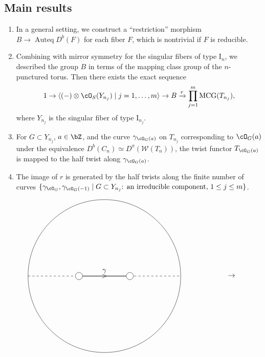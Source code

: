 \documentclass[a0,landscape]{a0poster}
\theoremstyle{plain}
\theoremstyle{definition}
\DeclareMathOperator{\Auteq}{\mathrm{Auteq}}
\DeclareMathOperator{\MCG}{\mathrm{MCG}}
\begin{document}
\begin{multicols}{3}
    \subsection{Main results}
    \begin{enumerate}
        \item In a general setting, we construct a ``restriction'' morphism $B \to \Auteq{D^b(F)}$ for each fiber $F$, which is nontrivial if $F$ is reducible.
        \item Combining with mirror symmetry for the singular fibers of type $\textrm{I}_n$, we described the group $B$ in terms of the mapping class group of the $n$-punctured torus. Then there exists the exact sequence
              \begin{equation}
                  1 \to \langle (-)\otimes \cO_S(Y_{n_j}) \mid j = 1, \dots, m\rangle \to B \xrightarrow{r} \prod_{j=1}^m \MCG(T_{n_j}),
              \end{equation}
              where $Y_{n_j}$ is the singular fiber of type $\textrm{I}_{n_j}$.
        \item For $G \subset Y_{n_j}$, $a \in \bZ$, and the curve $\gamma_{\cO_G(a)}$ on $T_{n_j}$ corresponding to $\cO_{G}(a)$ under the equivalence $D^b(C_n) \simeq D^\pi(\mathcal{W}(T_n))$, the twist functor $T_{\cO_G(a)}$ is mapped to the half twist along $\gamma_{\cO_G(a)}$.
        \item The image of $r$ is generated by the half twists along the finite number of curves $\{\gamma_{\cO_G}, \gamma_{\cO_G(-1)} \mid G \subset Y_{n_j}\text{: an irreducible component, } 1 \leq j \leq m \}$.
    \end{enumerate}

    \begin{center}
        \centering
        \begin{displaymath}
            \begin{tikzpicture}[scale=2.5]
                \draw (0, 1.5) circle[radius=1.5];
                \draw[thick] (-0.5, 1.5)--(0.5, 1.5);
                \draw(0, 1.5) node{$>$};
                \draw[dashed] (-1.5, 1.5)--(-0.5, 1.5);
                \draw[dashed] (0.5, 1.5)--(1.5, 1.5);

                \foreach \u in {-0.5, 0.5}
                    {
                        \filldraw[white] (\u, 1.5) circle (2pt);
                        \draw[black] (\u, 1.5) circle (2pt);
                    }
                \draw(0, 1.5) node[above]{$\gamma$};

                \draw(2.5, 1.5) node{$\rightarrow$};


\end{tikzpicture}
\end{displaymath}
\end{center}
\end{multicols}
\end{document}
